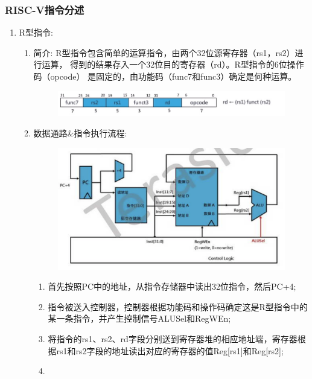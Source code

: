 \documentclass[a4paper, 14pt, oneside]{book} %
\numberwithin{equation}{subsection}
\begin{document}
			\subsubsection{RISC-V指令分述}
			\begin{enumerate}
				\item{R型指令:}
					\begin{enumerate}
						\item{简介:}
							\subitem
								R型指令包含简单的运算指令，由两个32位源寄存器（rs1，rs2）进行运算，
								得到的结果存入一个32位目的寄存器（rd）。R型指令的6位操作码（opcode）
								是固定的，由功能码（func7和func3）确定是何种运算。
								\begin{figure}[H]
									\centering
									\includegraphics[scale=0.5]{img/r1.png}
								\end{figure}
						\item{数据通路\&指令执行流程:}
							\begin{figure}[H]
								\centering
								\includegraphics[scale=0.5]{img/r2.png}
							\end{figure}
							\begin{enumerate}
								\item
									首先按照PC中的地址，从指令存储器中读出32位指令，然后PC+4;
								\item
									指令被送入控制器，控制器根据功能码和操作码确定这是R型指令中的某一条指令，并产生控制信号ALUSel和RegWEn;
								\item
									将指令的rs1、rs2、rd字段分别送到寄存器堆的相应地址端，寄存器根据rs1和rs2字段的地址读出对应的寄存器的值Reg[rs1]和Reg[rs2];
								\item

\end{enumerate}
\end{enumerate}
\end{enumerate}
\end{document}

